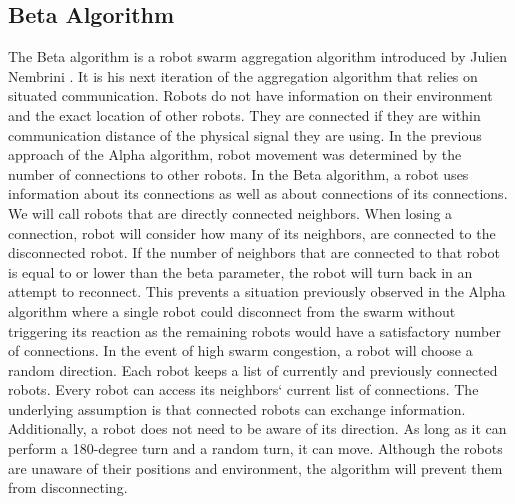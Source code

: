 \newpage
\subsection{Beta Algorithm}
The Beta algorithm is a robot swarm aggregation algorithm introduced by Julien Nembrini \cite{Nembrini2002}. It is his next iteration of the aggregation algorithm that relies on situated communication. Robots do not have information on their environment and the exact location of other robots. They are connected if they are within communication distance of the physical signal they are using. In the previous approach of the Alpha algorithm, robot movement was determined by the number of connections to other robots. In the Beta algorithm, a robot uses information about its connections as well as about connections of its connections. We will call robots that are directly connected neighbors. When losing a connection, robot will consider how many of its neighbors, are connected to the disconnected robot. If the number of neighbors that are connected to that robot is equal to or lower than the beta parameter, the robot will turn back in an attempt to reconnect. This prevents a situation previously observed in the Alpha algorithm where a single robot could disconnect from the swarm without triggering its reaction as the remaining robots would have a satisfactory number of connections. In the event of high swarm congestion, a robot will choose a random direction. Each robot keeps a list of currently and previously connected robots. Every robot can access its neighbors` current list of connections. The underlying assumption is that connected robots can exchange information. Additionally, a robot does not need to be aware of its direction. As long as it can perform a 180-degree turn and a random turn, it can move. Although the robots are unaware of their positions and environment, the algorithm will prevent them from disconnecting.

